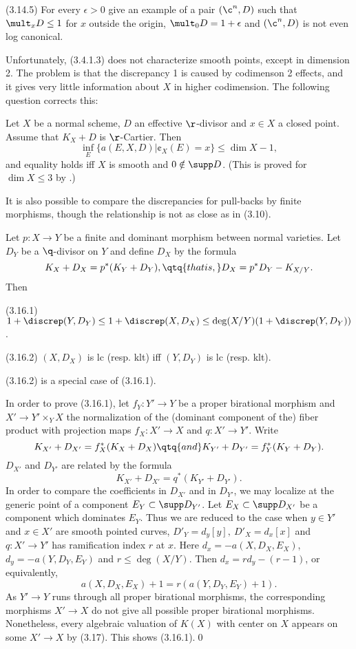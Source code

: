 (3.14.5) For every $\epsilon>0$ give an example of a pair $(\c^n,D)$ such that
$\mult_xD\leq 1$ for $x$ outside the origin, $\mult_0D=1+\epsilon$ and $(\c^n,D)$
is not even log canonical.
\enddemo






Unfortunately, (3.4.1.3)  does not characterize smooth points,
except in dimension 2. The  problem is that the discrepancy 1 is caused by
codimenson 2 effects, and it gives very little information about $X$ in higher
codimension.  The following question corrects this:

 \cite{Shokurov88} Let $X$ be a  normal scheme, 
$D$ an effective $\r$-divisor and $x\in X$ a closed point. Assume that $K_X+D$ is
$\r$-Cartier. Then 
$$
\inf_E\{a(E,X,D)|\cent_X(E)=x\}\leq \dim X-1,
$$
and equality holds iff $X$ is smooth and $0\notin \supp D$.
(This is proved for $\dim X\leq 3$ by  \cite{Markushevich96}.)
\endproclaim


It is also possible to compare the discrepancies for pull-backs by finite
morphisms, though the relationship is not as close as in (3.10).

 Let $p:X\to Y$ be a  finite and
dominant morphism between normal varieties. Let $D_Y$ be a $\q$-divisor on $Y$
and define $D_X$ by the formula
$$
K_X+D_X=p^*(K_Y+D_Y),\qtq{that is,} D_X=p^*D_Y-K_{X/Y}.
$$
Then 

(3.16.1) $1+\discrep(Y,D_Y)\leq 1+\discrep(X,D_X)\leq
\deg(X/Y)(1+\discrep(Y,D_Y))$.

(3.16.2) $(X,D_X)$ is lc (resp. klt) iff $(Y,D_Y)$ is lc (resp. klt).
\endproclaim 

\demop  (3.16.2) is a special case of (3.16.1). 

In order to prove (3.16.1), 
let $f_Y:Y'\to Y$ be a proper birational morphism and
$X'\to Y'\times_YX$ the normalization of the (dominant component of the) fiber
product with projection maps $f_X:X'\to X$ and $q:X'\to Y'$. Write
$$
K_{X'}+D_{X'}=f_X^*(K_X+D_X)\qtq{and} K_{Y'}+D_{Y'}=f_Y^*(K_Y+D_Y).
$$
$D_{X'}$ and $D_{Y'}$ are related by the formula
$$
K_{X'}+D_{X'}=q^*(K_{Y'}+D_{Y'}).
$$
 In order to compare the
coefficients in $ D_{X'}$ and in $D_{Y'}$, we may localize at the generic
point of a component  $E_Y\subset \supp D_{Y'}$.  
Let $E_X\subset \supp D_{X'}$ be a component which dominates $E_Y$.
Thus we are reduced to the
case when
$y\in Y'$ and $x\in X'$ are smooth pointed curves, $D'_Y=d_y[y],\ D'_X=d_x[x]$
and
$q: X'\to Y'$ has ramification index $r$ at $x$. 
Here $d_x=-a(X,D_X,E_X)$, $d_y=-a(Y,D_Y,E_Y)$  and
$r\leq
\deg(X/Y)$. Then
$d_x=rd_y-(r-1)$, or equivalently,
$$
a(X,D_X,E_X)+1=r(a(Y,D_Y,E_Y)+1).
$$
As $Y'\to Y$  runs through all proper birational morphisms, the
corresponding morphisms $X'\to X$ do  not give all possible proper birational
morphisms. Nonetheless, every algebraic valuation of $K(X)$ with center on $X$
appears on some $X'\to X$ by (3.17). This shows (3.16.1).\qed\enddemo

